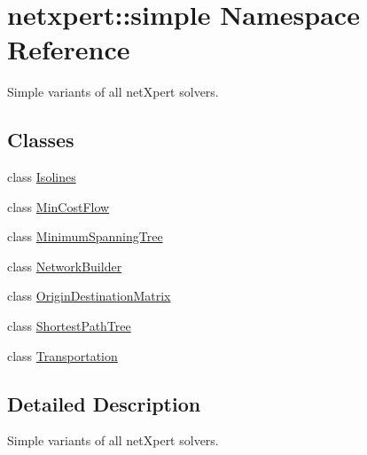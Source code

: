 \hypertarget{namespacenetxpert_1_1simple}{}\section{netxpert\+:\+:simple Namespace Reference}
\label{namespacenetxpert_1_1simple}


Simple variants of all net\+Xpert solvers.  


\subsection*{Classes}
\begin{DoxyCompactItemize}
\item 
class \hyperlink{classnetxpert_1_1simple_1_1Isolines}{Isolines}
\item 
class \hyperlink{classnetxpert_1_1simple_1_1MinCostFlow}{Min\+Cost\+Flow}
\item 
class \hyperlink{classnetxpert_1_1simple_1_1MinimumSpanningTree}{Minimum\+Spanning\+Tree}
\item 
class \hyperlink{classnetxpert_1_1simple_1_1NetworkBuilder}{Network\+Builder}
\item 
class \hyperlink{classnetxpert_1_1simple_1_1OriginDestinationMatrix}{Origin\+Destination\+Matrix}
\item 
class \hyperlink{classnetxpert_1_1simple_1_1ShortestPathTree}{Shortest\+Path\+Tree}
\item 
class \hyperlink{classnetxpert_1_1simple_1_1Transportation}{Transportation}
\end{DoxyCompactItemize}


\subsection{Detailed Description}
Simple variants of all net\+Xpert solvers. 